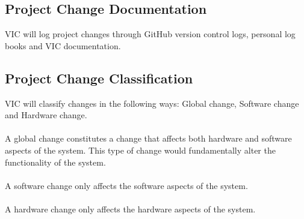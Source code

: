 \documentclass [12pt]{article}
\begin{document}
\subsection{Project Change Documentation}
VIC will log project changes through GitHub version control logs, personal log books and VIC documentation. 

\subsection{Project Change Classification}
VIC will classify changes in the following ways: Global change, Software change and Hardware change. \\\\
A global change constitutes a change that affects both hardware and software aspects of the system. This type of change would fundamentally alter the functionality of the system. \\ \\
A software change only affects the software aspects of the system. \\\\
A hardware change only affects the hardware aspects of the system.   




\end{document}
